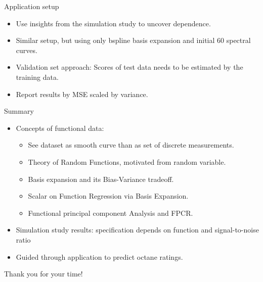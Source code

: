 \documentclass{beamer}
\begin{document}
	\begin{frame}{Application setup}
		\begin{itemize}
		\item
    		Use insights from the simulation study to uncover dependence.
    		\item
    		Similar setup, but using only bspline basis expansion and initial 60 spectral curves.
    		\item
    		Validation set approach:	Scores of test data needs to be estimated by the training data. 
    		\item
    		Report results by MSE scaled by variance.
		\end{itemize}
	\end{frame}
	
	\begin{frame}{Summary}
		\begin{itemize}
		\item
    		Concepts of functional data: 
    		\begin{itemize}
			\item See dataset as smooth curve than as set of discrete measurements.
    			\item Theory of Random Functions, motivated from random variable.
    			\item Basis expansion and its Bias-Variance tradeoff.
    			\item Scalar on Function Regression via Basis Expansion.
    			\item Functional principal component Analysis and FPCR.
		\end{itemize}
    		\item
    		Simulation study results: specification depends on function and signal-to-noise ratio
    		\item
    		Guided through application to predict octane ratings.
    		
		\end{itemize}
	\end{frame}
	
	\begin{frame}
		\vspace*{\fill}
		\begin{center}
			{\LARGE Thank you for your time!}
		\end{center}	
		\vspace*{\fill}
	\end{frame}
	
\end{document}
